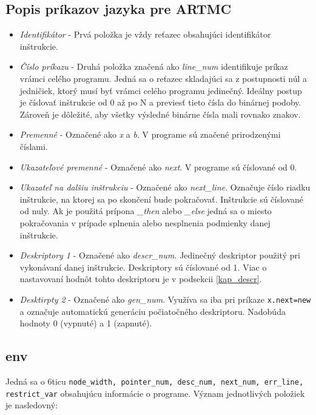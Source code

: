 \subsection{Popis príkazov jazyka pre ARTMC}
\begin{itemize}
    \item \textit{Identifikátor} - Prvá položka je vždy reťazec obsahujúci identifikátor inštrukcie.
    \item \textit{Číslo príkazu} - Druhá položka značená ako \textit{line\_num} identifikuje príkaz
        vrámci celého programu. Jedná sa o reťazec skladajúci sa z postupnosti
        núl a jedničiek, ktorý musí byť vrámci celého  programu jedinečný.
        Ideálny postup je číslovať inštrukcie od 0 až po N a previesť tieto
        čísla do binárnej podoby. Zároveň je dôležité, aby všetky výsledné binárne čísla mali rovnako znakov.
    \item \textit{Premenné} - Označené ako \textit{x} a \textit{b}. V programe sú značené prirodzenými číslami.
    \item \textit{Ukazateľové premenné} - Označené ako \textit{next}. V programe sú číslované od 0.
    \item \textit{Ukazateľ na dalšiu inštrukciu} - Označené ako \textit{next\_line}. Označuje
        číslo riadku inštrukcie, na ktorej sa po skončení bude pokračovať. Inštrukcie
        sú číslované od nuly. Ak je použitá prípona \textit{\_then} alebo \textit{\_else}
        jedná sa o miesto pokračovania v prípade splnenia alebo nesplnenia podmienky danej inštrukcie.
    \item \textit{Deskriptory 1} - Označené ako \textit{descr\_num}. Jedinečný deskriptor použitý pri vykonávaní danej inštrukcie. Deskriptory sú číslované od 1. Viac o nastavovaní hodnôt tohto deskriptoru je v podsekcii \ref{kap_descr}.
    \item \textit{Desktirpty 2} - Označené ako \textit{gen\_num}. Využíva sa iba pri príkaze \texttt{x.next=new} a označuje automatickú generáciu počiatočného deskriptoru. Nadobúda hodnoty 0 (vypnuté) a 1 (zapnuté).
\end{itemize}

\subsection{env}
Jedná sa o 6ticu \texttt{node\_width, pointer\_num, desc\_num, next\_num, err\_line, restrict\_var} obsahujúcu informácie o programe.
Význam jednotlivých položiek je nasledovný:


